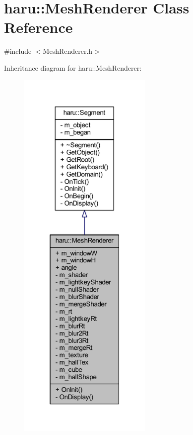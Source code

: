 \hypertarget{classharu_1_1_mesh_renderer}{}\section{haru\+:\+:Mesh\+Renderer Class Reference}
\label{classharu_1_1_mesh_renderer}


{\ttfamily \#include $<$Mesh\+Renderer.\+h$>$}



Inheritance diagram for haru\+:\+:Mesh\+Renderer\+:\nopagebreak
\begin{figure}[H]
\begin{center}
\leavevmode
\includegraphics[width=184pt]{classharu_1_1_mesh_renderer__inherit__graph}
\end{center}
\end{figure}


